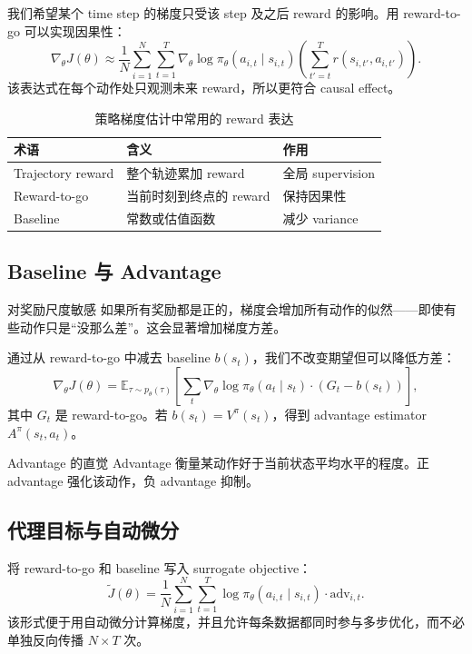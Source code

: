 \documentclass[a4paper]{article}
\begin{document}
我们希望某个 time step 的梯度只受该 step 及之后 reward 的影响。用 reward-to-go 可以实现因果性：
$$\nabla_\theta J(\theta) \approx \frac{1}{N}\sum_{i=1}^{N}\sum_{t=1}^{T} \nabla_\theta \log \pi_\theta(a_{i,t} \mid s_{i,t}) \left(\sum_{t'=t}^{T} r(s_{i,t'}, a_{i,t'}) \right).$$
该表达式在每个动作处只观测未来 reward，所以更符合 causal effect。

\begin{table}[H]
\centering
\small
\begin{tabular}{p{}p{}p{}}
\toprule
术语 & 含义 & 作用 \\
\midrule
Trajectory reward & 整个轨迹累加 reward & 全局 supervision \\
Reward-to-go & 当前时刻到终点的 reward & 保持因果性 \\
Baseline & 常数或估值函数 & 减少 variance \\
\bottomrule
\end{tabular}
\caption{策略梯度估计中常用的 reward 表达}
\end{table}

\subsection{Baseline 与 Advantage}

\begin{warningbox}{对奖励尺度敏感}
如果所有奖励都是正的，梯度会增加所有动作的似然——即使有些动作只是“没那么差”。这会显著增加梯度方差。
\end{warningbox}

通过从 reward-to-go 中减去 baseline $b(s_t)$，我们不改变期望但可以降低方差：
$$\nabla_\theta J(\theta) = \mathbb{E}_{\tau \sim p_\theta(\tau)} \left[\sum_t \nabla_\theta \log \pi_\theta(a_t \mid s_t) \cdot (G_t - b(s_t))\right],$$
其中 $G_t$ 是 reward-to-go。若 $b(s_t)=V^\pi(s_t)$，得到 advantage estimator $A^\pi(s_t,a_t)$。

\begin{importantbox}{Advantage 的直觉}
Advantage 衡量某动作好于当前状态平均水平的程度。正 advantage 强化该动作，负 advantage 抑制。
\end{importantbox}

\subsection{代理目标与自动微分}

将 reward-to-go 和 baseline 写入 surrogate objective：
$$\tilde{J}(\theta) = \frac{1}{N}\sum_{i=1}^{N}\sum_{t=1}^{T} \log \pi_\theta(a_{i,t} \mid s_{i,t}) \cdot \text{adv}_{i,t}.$$
该形式便于用自动微分计算梯度，并且允许每条数据都同时参与多步优化，而不必单独反向传播 $N \times T$ 次。
\end{document}
